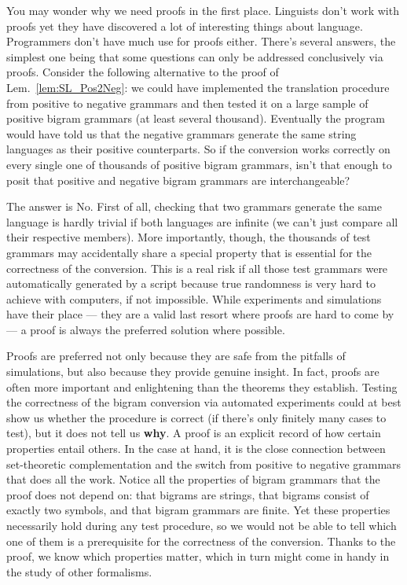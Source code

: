 You may wonder why we need proofs in the first place.
Linguists don't work with proofs yet they have discovered a lot of interesting things about language.
Programmers don't have much use for proofs either.
There's several answers, the simplest one being that some questions can only be addressed conclusively via proofs.
Consider the following alternative to the proof of Lem.~\ref{lem:SL_Pos2Neg}: we could have implemented the translation procedure from positive to negative grammars and then tested it on a large sample of positive bigram grammars (at least several thousand).
Eventually the program would have told us that the negative grammars generate the same string languages as their positive counterparts.
So if the conversion works correctly on every single one of thousands of positive bigram grammars, isn't that enough to posit that positive and negative bigram grammars are interchangeable?

The answer is No.
First of all, checking that two grammars generate the same language is hardly trivial if both languages are infinite (we can't just compare all their respective members).
More importantly, though, the thousands of test grammars may accidentally share a special property that is essential for the correctness of the conversion.
This is a real risk if all those test grammars were automatically generated by a script because true randomness is very hard to achieve with computers, if not impossible.
While experiments and simulations have their place --- they are a valid last resort where proofs are hard to come by --- a proof is always the preferred solution where possible.

Proofs are preferred not only because they are safe from the pitfalls of simulations, but also because they provide genuine insight.
In fact, proofs are often more important and enlightening than the theorems they establish.
Testing the correctness of the bigram conversion via automated experiments could at best show us whether the procedure is correct (if there's only finitely many cases to test), but it does not tell us \textbf{why}.
A proof is an explicit record of how certain properties entail others.
In the case at hand, it is the close connection between set-theoretic complementation and the switch from positive to negative grammars that does all the work.
Notice all the properties of bigram grammars that the proof does not depend on: that bigrams are strings, that bigrams consist of exactly two symbols, and that bigram grammars are finite. 
Yet these properties necessarily hold during any test procedure, so we would not be able to tell which one of them is a prerequisite for the correctness of the conversion.
Thanks to the proof, we know which properties matter, which in turn might come in handy in the study of other formalisms.

